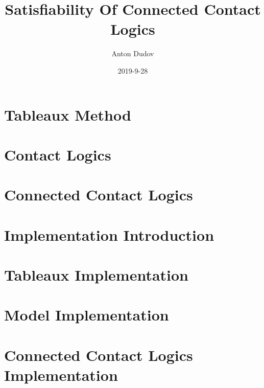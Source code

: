 \documentclass{article}
\title{Satisfiability Of Connected Contact Logics}
\date{2019-9-28}
\author{Anton Dudov}
\begin{document}
	\maketitle
	\newpage

	\tableofcontents

	\newpage

	\section{Tableaux Method}

	\newpage
	\section{Contact Logics}
	
	\newpage
	\section{Connected Contact Logics}

	\newpage
	\section{Implementation Introduction}

	\newpage
	\section{Tableaux Implementation}

	\newpage
	\section{Model Implementation}

	\newpage
	\section{Connected Contact Logics Implementation}
	
\end{document}
